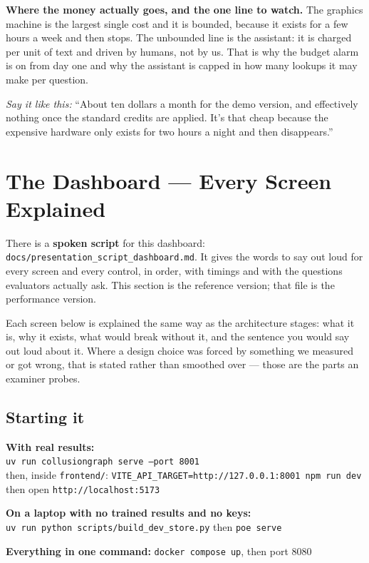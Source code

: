 \documentclass[11pt,a4paper]{article}
\newcommand{\code}[1]{\texttt{\small #1}}
\newcommand{\aloud}[1]{\par\smallskip\noindent\textit{\textcolor{accent}{Say
it like this:}} ``#1''\par\smallskip}
\begin{document}
\textbf{Where the money actually goes, and the one line to watch.} The
graphics machine is the largest single cost and it is bounded, because it exists
for a few hours a week and then stops. The unbounded line is the assistant: it
is charged per unit of text and driven by humans, not by us. That is why the
budget alarm is on from day one and why the assistant is capped in how many
lookups it may make per question.

\aloud{About ten dollars a month for the demo version, and effectively nothing
once the standard credits are applied. It's that cheap because the expensive
hardware only exists for two hours a night and then disappears.}

\section{The Dashboard --- Every Screen Explained}
\label{sec:dashboard}

There is a \textbf{spoken script} for this dashboard:
\code{docs/presentation\_script\_dashboard.md}. It gives the words to say out
loud for every screen and every control, in order, with timings and with the
questions evaluators actually ask. This section is the reference version; that
file is the performance version.

Each screen below is explained the same way as the architecture stages: what it
is, why it exists, what would break without it, and the sentence you would say
out loud about it. Where a design choice was forced by something we measured or
got wrong, that is stated rather than smoothed over --- those are the parts an
examiner probes.

\subsection{Starting it}

\begin{plain}
\textbf{With real results:}\\
\code{uv run collusiongraph serve --port 8001}\\
then, inside \code{frontend/}: \code{VITE\_API\_TARGET=http://127.0.0.1:8001 npm run dev}\\
then open \code{http://localhost:5173}

\vspace{4pt}
\textbf{On a laptop with no trained results and no keys:}\\
\code{uv run python scripts/build\_dev\_store.py} then \code{poe serve}

\vspace{4pt}
\textbf{Everything in one command:} \code{docker compose up}, then port 8080
\end{plain}
\end{document}
